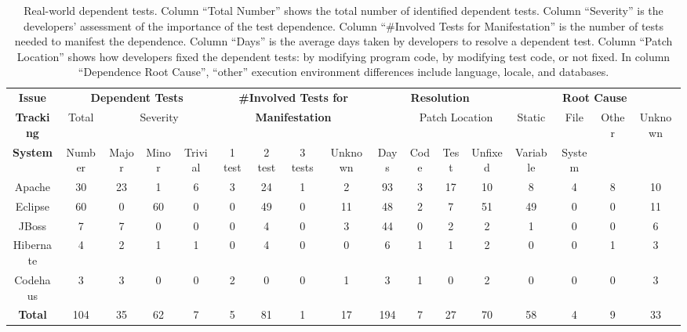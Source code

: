 \begin{table*}[t]
\vspace{1mm}
\centering
\small{
\setlength{\tabcolsep}{.10\tabcolsep}
\begin{tabular}{|c||c|c|c|c||c|c|c|c||c|c|c|c||c|c|c|c|}
\hline
\textbf{Issue}&\multicolumn{4}{|c||}{\textbf{Dependent Tests}}&\multicolumn{4}{|c||}{\textbf{\#Involved Tests for}}&\multicolumn{4}{|c||}{\textbf{Resolution}}&\multicolumn{4}{|c|}{\textbf{Root Cause}}\\
\cline{2-5}\cline{10-17}
\textbf{Tracking} &Total&\multicolumn{3}{|c||}{Severity}&\multicolumn{4}{|c||}{\textbf{Manifestation}}&
&\multicolumn{3}{|c||}{Patch Location}&Static&File & Other & Unknown\\
\cline{3-9}\cline{11-13}
\textbf{System}&Number&Major&Minor&Trivial&1 test&2 test&3 tests & Unknown&Days&Code&Test&Unfixed&Variable&System& &\\
\hline
Apache&30&23&1&6&3&24&1&2&93&3&17&10&8&4&8 &10\\
\hline
Eclipse&60&0&60&0&0&49&0&11&48&2&7&51&49&0&0 &11\\
\hline
JBoss&7&7&0&0&0&4&0&3&44&0&2&2&1&0& 0 & 6\\
\hline
Hibernate&4&2&1&1&0&4&0&0&6&1&1&2&0&0& 1 & 3\\
\hline
Codehaus&3&3&0&0&2&0&0&1&3&1&0&2&0&0&0 &3\\
\hline
\hline
\textbf{Total} & 104 &35&62&7&5&81&1&17&194&7&27&70&58&4&9&33\\
\hline
\end{tabular}
}
\vspace{-2mm}
\caption{{\label{tab:studyresults}
Real-world dependent tests.
Column ``Total Number'' shows the total number of identified dependent tests.
Column ``Severity'' is the developers' assessment of the importance of the
test dependence.
Column ``\#Involved Tests for Manifestation'' is the number of tests needed
to manifest the dependence. Column ``Days'' is the
average days taken by developers to resolve a dependent test.
Column ``Patch Location'' shows how developers fixed the dependent tests:
by modifying program code, by modifying test code, or not fixed.
In column ``Dependence Root Cause'', ``other'' execution environment
differences include language, locale, and databases.
}
}
\end{table*}
